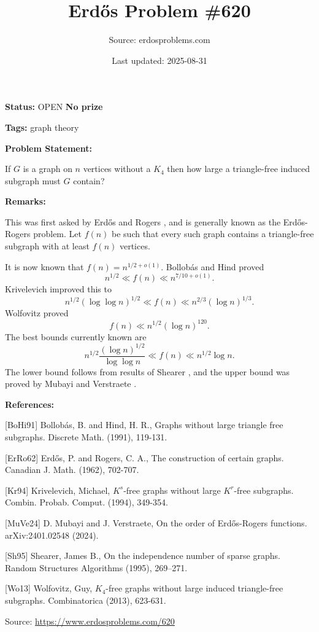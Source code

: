 \documentclass{article}
\title{Erd\H{o}s Problem \#620}
\date{Last updated: 2025-08-31}
\author{Source: erdosproblems.com}
\begin{document}
\maketitle

\noindent\textbf{Status:} OPEN \quad \textbf{No prize}

\noindent\textbf{Tags:} graph theory

\medskip
\noindent\textbf{Problem Statement:}

If $G$ is a graph on $n$ vertices without a $K_4$ then how large a triangle-free induced subgraph must $G$ contain?

\bigskip
\noindent\textbf{Remarks:}

This was first asked by Erd\H{o}s and Rogers \cite{ErRo62}, and is generally known as the Erd\H{o}s-Rogers problem. Let $f(n)$ be such that every such graph contains a triangle-free subgraph with at least $f(n)$ vertices.

It is now known that $f(n)=n^{1/2+o(1)}$. Bollob\'{a}s and Hind \cite{BoHi91} proved\[n^{1/2} \ll f(n) \ll n^{7/10+o(1)}.\]Krivelevich \cite{Kr94} improved this to\[n^{1/2}(\log\log n)^{1/2} \ll f(n) \ll n^{2/3}(\log n)^{1/3}.\]Wolfovitz \cite{Wo13} proved\[f(n) \ll n^{1/2}(\log n)^{120}.\]The best bounds currently known are\[n^{1/2}\frac{(\log n)^{1/2}}{\log\log n}\ll f(n) \ll n^{1/2}\log n.\]The lower bound follows from results of Shearer \cite{Sh95}, and the upper bound was proved by Mubayi and Verstraete \cite{MuVe24}.

\bigskip
\noindent\textbf{References:}

[BoHi91] Bollob\'{a}s, B. and Hind, H. R., Graphs without large triangle free subgraphs. Discrete Math. (1991), 119-131.
 
 [ErRo62] Erd\H{o}s, P. and Rogers, C. A., The construction of certain graphs. Canadian J. Math. (1962), 702-707.
 
 [Kr94] Krivelevich, Michael, {$K^s$}-free graphs without large {$K^r$}-free subgraphs. Combin. Probab. Comput. (1994), 349-354.
 
 [MuVe24] D. Mubayi and J. Verstraete, On the order of Erd\H{o}s-Rogers functions. arXiv:2401.02548 (2024).
 
 [Sh95] Shearer, James B., On the independence number of sparse graphs. Random Structures Algorithms (1995), 269--271.
 
 [Wo13] Wolfovitz, Guy, {$K_4$}-free graphs without large induced triangle-free
subgraphs. Combinatorica (2013), 623-631.

\bigskip
\noindent\small{Source: \url{https://www.erdosproblems.com/620}}
\end{document}
